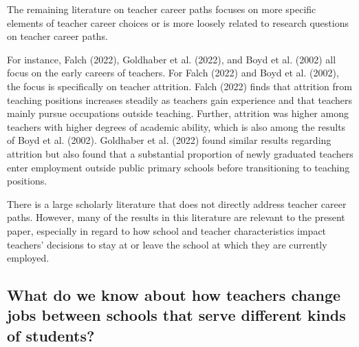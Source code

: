 \documentclass[
]{article}
\begin{document}
The remaining literature on teacher career paths focuses on more specific elements of teacher career choices or is more loosely related to research questions on teacher career paths.

For instance, Falch (2022), Goldhaber et al. (2022), and Boyd et al. (2002) all focus on the early careers of teachers. For Falch (2022) and Boyd et al. (2002), the focus is specifically on teacher attrition. Falch (2022) finds that attrition from teaching positions increases steadily as teachers gain experience and that teachers mainly pursue occupations outside teaching. Further, attrition was higher among teachers with higher degrees of academic ability, which is also among the results of Boyd et al. (2002). Goldhaber et al. (2022) found similar results regarding attrition but also found that a substantial proportion of newly graduated teachers enter employment outside public primary schools before transitioning to teaching positions.

There is a large scholarly literature that does not directly address teacher career paths. However, many of the results in this literature are relevant to the present paper, especially in regard to how school and teacher characteristics impact teachers' decisions to stay at or leave the school at which they are currently employed.

\hypertarget{what-do-we-know-about-how-teachers-change-jobs-between-schools-that-serve-different-kinds-of-students}{%
\subsection{What do we know about how teachers change jobs between schools that serve different kinds of students?}\label{what-do-we-know-about-how-teachers-change-jobs-between-schools-that-serve-different-kinds-of-students}}
\end{document}
